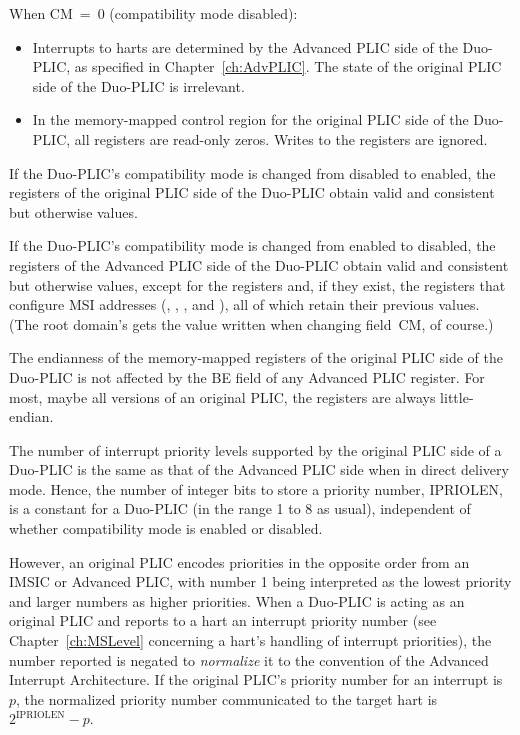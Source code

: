 When CM~=~0 (compatibility mode disabled):
\begin{itemize}

\item
Interrupts to harts are determined by the Advanced PLIC side of the
\mbox{Duo-PLIC}, as specified in Chapter~\ref{ch:AdvPLIC}.
The state of the original PLIC side of the \mbox{Duo-PLIC} is
irrelevant.

\item
In the memory-mapped control region for the original PLIC side of the
\mbox{Duo-PLIC}, all registers are read-only zeros.
Writes to the registers are ignored.

\end{itemize}

If the \mbox{Duo-PLIC}'s compatibility mode is changed from disabled to
enabled, the registers of the original PLIC side of the \mbox{Duo-PLIC}
obtain valid and consistent but otherwise {\unspecified} values.

If the \mbox{Duo-PLIC}'s compatibility mode is changed from
enabled to disabled, the registers of the Advanced PLIC side of
the \mbox{Duo-PLIC} obtain valid and consistent but otherwise
{\unspecified} values, except for the  registers
and, if they exist, the registers that configure MSI addresses
(, , , and
), all of which retain their previous values.
(The root domain's  gets the value written when changing
field~CM, of course.)

The endianness of the memory-mapped registers of the original PLIC side
of the \mbox{Duo-PLIC} is not affected by the BE field of any Advanced
PLIC  register.
For most, maybe all versions of an original PLIC, the registers are
always little-endian.

The number of interrupt priority levels supported by the original PLIC
side of a \mbox{Duo-PLIC} is the same as that of the Advanced PLIC side
when in direct delivery mode.
Hence, the number of integer bits to store a priority number, IPRIOLEN,
is a constant for a \mbox{Duo-PLIC} (in the range 1 to 8 as usual),
independent of whether compatibility mode is enabled or disabled.

However, an original PLIC encodes priorities in the opposite order
from an IMSIC or Advanced PLIC, with number 1 being interpreted as the
lowest priority and larger numbers as higher priorities.
When a \mbox{Duo-PLIC} is acting as an original PLIC and reports to
a hart an interrupt priority number (see Chapter~\ref{ch:MSLevel}
concerning a hart's handling of interrupt priorities), the number
reported is negated to \emph{normalize} it to the convention of the
Advanced Interrupt Architecture.
If the original PLIC's priority number for an interrupt is~$p$,
the normalized priority number communicated to the target hart is
${\mbox{2}^\textrm{IPRIOLEN}-p}$.

